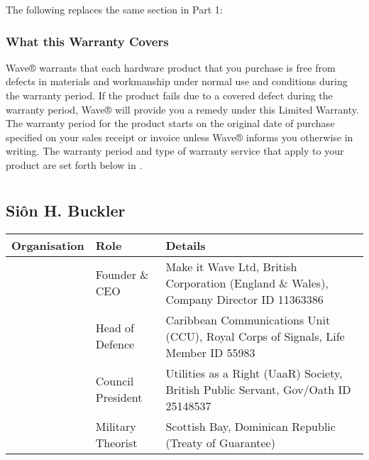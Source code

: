 \documentclass[letterpaper,10pt,english]{sphinxmanual}
\begin{document}
The following replaces the same section in Part 1:


\subsection{What this Warranty Covers}
\label{\detokenize{part3:what-this-warranty-covers}}
Wave® warrants that each hardware product that you purchase is free from defects in materials and workmanship under normal use and conditions during the warranty period. If the product fails due to a covered defect during the warranty period, Wave® will provide you a remedy under this Limited Warranty. The warranty period for the product starts on the original date of purchase specified on your sales receipt or invoice unless Wave® informs you otherwise in writing. The warranty period and type of warranty service that apply to your product are set forth below in .


\chapter{}
\label{\detokenize{index:document-author-s}}

\section{Siôn H. Buckler}
\label{\detokenize{index:sion-h-buckler}}

\begin{savenotes}\sphinxattablestart
\centering
\begin{tabulary}{\linewidth}[t]{|T|T|T|}
\hline
\sphinxstyletheadfamily 
Organisation
&\sphinxstyletheadfamily 
Role
&\sphinxstyletheadfamily 
Details
\\
\hline
\noindent{}
&
Founder \& CEO
&
Make it Wave Ltd, British Corporation (England \& Wales), Company Director ID 11363386
\\
\hline
\noindent{}
&
Head of Defence
&
Caribbean Communications Unit (CCU), Royal Corps of Signals, Life Member ID 55983
\\
\hline
\noindent{}
&
Council President
&
Utilities as a Right (UaaR) Society, British Public Servant, Gov/Oath ID 25148537
\\
\hline
\noindent{}
&
Military Theorist
&
Scottish Bay, Dominican Republic (Treaty of Guarantee)
\\
\hline
\end{tabulary}
\par
\sphinxattableend\end{savenotes}
\end{document}
